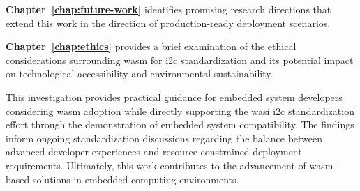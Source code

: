 \textbf{Chapter~\ref{chap:future-work}} identifies promising research directions that extend this work in the direction of production-ready deployment scenarios.

\textbf{Chapter~\ref{chap:ethics}} provides a brief examination of the ethical considerations surrounding \acrshort{wasm} for \acrshort{i2c} standardization and its potential impact on technological accessibility and environmental sustainability.

This investigation provides practical guidance for embedded system developers considering \acrshort{wasm} adoption while directly supporting the \acrshort{wasi} \acrshort{i2c} standardization effort through the demonstration of embedded system compatibility. The findings inform ongoing standardization discussions regarding the balance between advanced developer experiences and resource-constrained deployment requirements. Ultimately, this work contributes to the advancement of \acrshort{wasm}-based solutions in embedded computing environments.